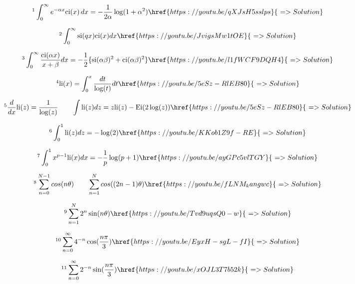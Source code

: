 \documentclass[12pt]{article}
\begin{document}
\[
\footnote{Laplace Transform of $\text{ci}$ function} \int_0^{\infty} e^{-\alpha x} \text{ci}(x) \, dx = -\frac{1}{2 \alpha} \log(1 + \alpha^2)    \href{https://youtu.be/qXJsH5sslps}{\,\, => Solution} 
\]
 
 \[ \footnote{ Combination of Sine Integral Function and Cosine Integral Function } \int_0^{\infty} \text{si}(qx) \text{ci}(x) dx      \href{https://youtu.be/JvigsMw1tOE}{\,\, => Solution}  \]
 
 \[ \footnote{ The answer is a cool combination of sine and cosine integral function} \int_0^{\infty} \frac{\text{ci}(\alpha x)}{x+\beta} dx = - \frac{1}{2} \{ \text{si}(\alpha \beta)^2 + \text{ci}(\alpha \beta)^2  \}    \href{https://youtu.be/l1fWCF9DQH4}{\,\, => Solution}   \]
 
\[ \footnote{ A short and cozy introduction to Logarithm Integral Function li(x) } \text{li}(x) = \int_0^x \frac{dt}{\log(t)} dt  \href{https://youtu.be/5eSz-RlEB80}{\,\, => Solution}   \] 
 
\[ \footnote { Differential and Integral of Logarithm Integral Function} \frac{d}{dx}\text{li}(z) = \frac{1}{\log(z)} \quad \quad \int \text{li}(z) dz = z \text{li}(z) - \text{Ei}(2 \log(z))    \href{https://youtu.be/5eSz-RlEB80}{\,\, => Solution}   \]
  
\[ \footnote{ A mysteriously simple integral} \int_0^1 \text{li}(z) dz = - \log(2)    \href{https://youtu.be/KKob1Z9f-RE}{\,\, => Solution}   \]

\[  \footnote{ Mellin Transform of Logarithm Integral Function} \int_0^1 x^{p-1} \text{li}(x) dx = - \frac{1}{p} \log(p+1) \href{https://youtu.be/ayGPc5vlTGY}{\,\, => Solution}    \]

\[ \footnote{ Such sums become easier with Complex Summation Technique} \sum_{n=0}^{N-1} cos(n\theta) \quad \quad \sum_{n=1}^{N} cos((2n-1)\theta) \href{https://youtu.be/fLNM_kangwc}{\,\, => Solution}     \]

\[ \footnote{ Problems involving Complex Summation Technique - I} \sum_{n=1}^{N} 2^n \sin(n \theta)  \href{https://youtu.be/Tvd9uqsQ0-w}{\,\, => Solution}    \]

\[ \footnote{ Problems involving Complex Summation Technique - II} \sum_{n=0}^{\infty} 4^{-n} \cos(\frac{n \pi}{3})   \href{https://youtu.be/EyxH-sgL-fI}{\,\, => Solution}   \]

\[ \footnote{ Problems involving Complex Summation Technique - III} \sum_{n=0}^{\infty} 2^{-n} \sin(\frac{n \pi}{3}) \href{https://youtu.be/xOJL3T7b52k}{\,\, => Solution}    \]
\end{document}
